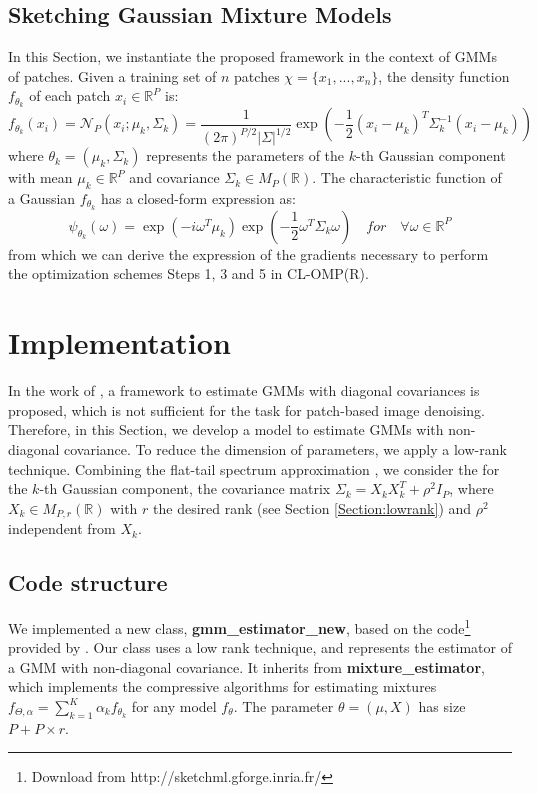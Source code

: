\documentclass[12pt,a4paper]{article}
\begin{document}
\subsection{Sketching Gaussian Mixture Models}
In this Section, we instantiate the proposed framework in the context of GMMs of patches.
Given a training set of $n$ patches $\chi = \{x_1,...,x_n\}$, the density function $f_{\theta_k}$ of each patch $x_i \in \mathbb{R}^P$ is:
\begin{equation}
    f_{\theta_k}(x_i) = \mathcal{N}_P(x_i;\mu_k,\Sigma_k) = \frac{1}{(2\pi)^{P/2}|\Sigma|^{1/2}}\exp(-\frac{1}{2}(x_i-\mu_k)^T\Sigma_k^{-1}(x_i-\mu_k))
\end{equation}
where $\theta_k = (\mu_k,\Sigma_k)$ represents the parameters of the $k$-th Gaussian component with mean $\mu_k \in \mathbb{R}^P$ and covariance $\Sigma_k \in M_P(\mathbb{R})$.
The characteristic function of a Gaussian $f_{\theta_k}$ has a closed\hyp{}form expression as:
\begin{equation}
    \psi_{\theta_k}(\omega) = \exp(-i\omega^T\mu_k)\exp(-\frac{1}{2}\omega^T \Sigma_k \omega) \quad for  \quad \forall \omega \in \mathbb{R}^P
\end{equation}
from which we can derive the expression of the gradients necessary to perform the optimization schemes Steps 1, 3 and 5 in CL\hyp{}OMP(R).

\section{Implementation}
In the work of \cite{keriven:hal-01329195}, a framework to estimate GMMs with diagonal covariances is proposed, which is not sufficient for the task for patch-based image denoising.
Therefore, in this Section, we develop a model to estimate GMMs with non-diagonal covariance.
To reduce the dimension of parameters, we apply a low-rank technique.
Combining the flat-tail spectrum approximation \cite{parameswaran:hal-01617722}, we consider the for the $k$-th Gaussian component, the covariance matrix $\Sigma_k = X_k X_k^T + \rho^2I_P$, where $X_k \in M_{P,r}(\mathbb{R})$ with $r$ the desired rank (see Section \ref{Section:lowrank}) and $\rho^2$ independent from $X_k$. 

\subsection{Code structure}
We implemented a new class, \textbf{gmm\_estimator\_new}, based on the code\footnote{Download from http://sketchml.gforge.inria.fr/} provided by \cite{keriven:hal-01329195}.
Our class uses a low rank technique, and represents the estimator of a GMM with non\hyp{}diagonal covariance.
It inherits from \textbf{mixture\_estimator}, which implements the compressive algorithms for estimating mixtures $f_{\Theta,\alpha} = \sum_{k = 1}^K \alpha_k f_{\theta_k}$ for any model $f_\theta$.
The parameter $\theta = (\mu, X)$ has size $P + P \times r$.
\end{document}
